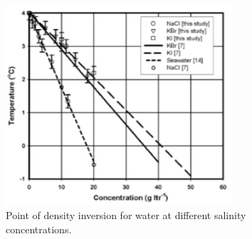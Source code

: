 \documentclass[../primer.tex]{subfiles}
\begin{document}
\begin{figure}[!ht]
  \includegraphics[width=0.75\textwidth]{./images/inversion_salt}
  \caption{Point of density inversion for water at different salinity
    concentrations.}
  \label{fig:inversion-salt}
\end{figure}
\end{document}
